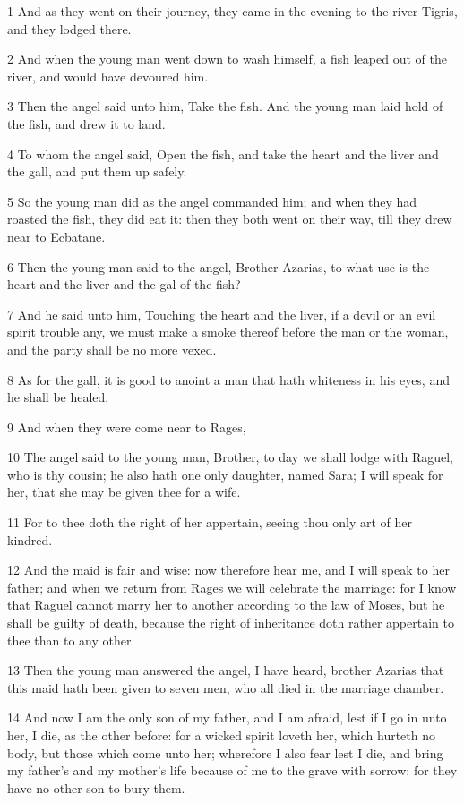 \par 1 And as they went on their journey, they came in the evening to the river Tigris, and they lodged there.
\par 2 And when the young man went down to wash himself, a fish leaped out of the river, and would have devoured him.
\par 3 Then the angel said unto him, Take the fish. And the young man laid hold of the fish, and drew it to land.
\par 4 To whom the angel said, Open the fish, and take the heart and the liver and the gall, and put them up safely.
\par 5 So the young man did as the angel commanded him; and when they had roasted the fish, they did eat it: then they both went on their way, till they drew near to Ecbatane.
\par 6 Then the young man said to the angel, Brother Azarias, to what use is the heart and the liver and the gal of the fish?
\par 7 And he said unto him, Touching the heart and the liver, if a devil or an evil spirit trouble any, we must make a smoke thereof before the man or the woman, and the party shall be no more vexed.
\par 8 As for the gall, it is good to anoint a man that hath whiteness in his eyes, and he shall be healed.
\par 9 And when they were come near to Rages,
\par 10 The angel said to the young man, Brother, to day we shall lodge with Raguel, who is thy cousin; he also hath one only daughter, named Sara; I will speak for her, that she may be given thee for a wife.
\par 11 For to thee doth the right of her appertain, seeing thou only art of her kindred.
\par 12 And the maid is fair and wise: now therefore hear me, and I will speak to her father; and when we return from Rages we will celebrate the marriage: for I know that Raguel cannot marry her to another according to the law of Moses, but he shall be guilty of death, because the right of inheritance doth rather appertain to thee than to any other.
\par 13 Then the young man answered the angel, I have heard, brother Azarias that this maid hath been given to seven men, who all died in the marriage chamber.
\par 14 And now I am the only son of my father, and I am afraid, lest if I go in unto her, I die, as the other before: for a wicked spirit loveth her, which hurteth no body, but those which come unto her; wherefore I also fear lest I die, and bring my father's and my mother's life because of me to the grave with sorrow: for they have no other son to bury them.
